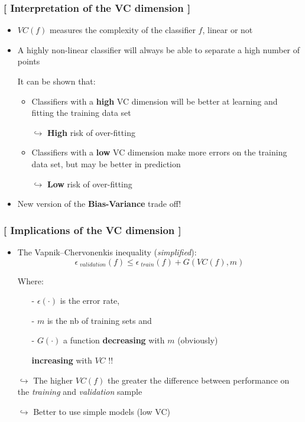 \documentclass[xcolor=x11names,compress, handhouts]{beamer}
\renewcommand{\(}{\begin{columns}}
\renewcommand{\)}{\end{columns}}
\newcommand{\<}[1]{\begin{column}{#1}}
\renewcommand{\>}{\end{column}}
\begin{document}
\begin{frame} %
\frametitle{\textcolor{brique}{[ Interpretation of the VC dimension ]}}
\pause
\begin{itemize}[<+->]
    \item $VC(f)$  measures the complexity of the classifier $f$, linear or not 
    \item A highly non-linear classifier will always be able to separate a high number of points
    \item[] It can be shown that: 
    \begin{itemize}[<+->]
    \item Classifiers with a \textbf{high} VC dimension will be better at learning and fitting the training data set
    \item[$\hookrightarrow$]  \textbf{High} risk of over-fitting  
    \item Classifiers with a \textbf{low} VC dimension make more errors on the training data set, but may be better in prediction
    \item[$\hookrightarrow$]  \textbf{Low} risk of over-fitting 
    \end{itemize}
\item New version of the \textbf{Bias-Variance} trade off!
\end{itemize}
\end{frame}

\begin{frame} %
\frametitle{\textcolor{brique}{[ Implications of the VC dimension ]}}
\pause
\begin{itemize}[<+->]
    \item The  Vapnik–Chervonenkis inequality (\emph{simplified}):
    $$
        \epsilon_{\;validation}(f)  \leq   \epsilon_{\;train}(f)  + G( VC(f) , m)
    $$
    \item[] Where: 
    \begin{itemize}[<+->]
        \item[-] $\epsilon(\cdot)$ is the error rate,
        \item[-] $m$ is the nb of training sets and
        \item[-]  $G(\cdot)$  a function \textbf{decreasing }with  $m$ (obviously)  %
        \item[]  \hspace{2.45cm}  \textbf{increasing} with $VC$ !! %
    \end{itemize}
    \item[$\hookrightarrow$] The higher $VC(f)$ the greater the difference between performance on the \textit{training} and \textit{validation} sample
    \item[$\hookrightarrow$] Better to use simple models (low VC)
\end{itemize}
\end{frame}
\end{document}
